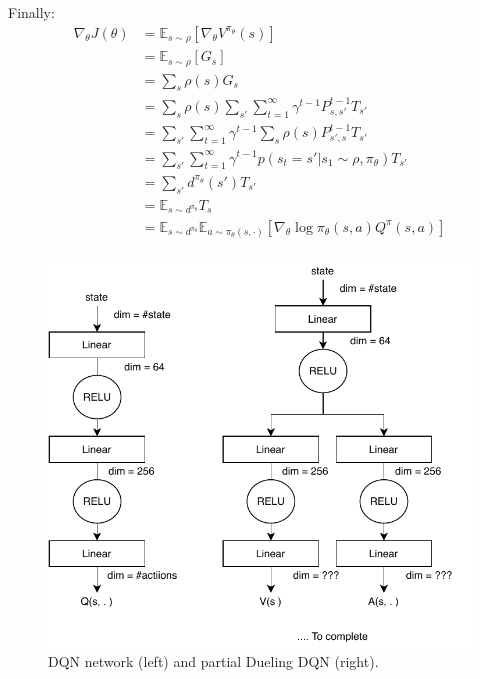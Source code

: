 \documentclass[a4paper]{article}
\begin{document}
Finally:
\begin{equation*}
    \begin{aligned}
        \nabla_\theta J(\theta) & = \mathbb{E}_{s \sim \rho}\left[ \nabla_\theta V^{\pi_\theta}(s) \right]                  \\
                                & = \mathbb{E}_{s \sim \rho}\left[ G_s \right]                                              \\
                                & = \sum_s \rho(s) G_s                                                                      \\
                                & = \sum_s \rho(s) \sum_{s'} \sum_{t=1}^\infty \gamma^{t-1} P^{t-1}_{s, s'} T_{s'}          \\
                                & = \sum_{s'} \sum_{t=1}^\infty \gamma^{t-1} \sum_s \rho(s) P^{t-1}_{s', s} T_{s'}          \\
                                & = \sum_{s'} \sum_{t=1}^\infty \gamma^{t-1} p(s_t = s' | s_1 \sim \rho, \pi_\theta) T_{s'} \\
                                & = \sum_{s'} d^{\pi_\theta}(s') T_{s'}                                                     \\
                                & = \mathbb{E}_{s \sim d^{\pi_\theta}} T_s                                                  \\
                                & \boxed{= \mathbb{E}_{s \sim d^{\pi_\theta}} \mathbb{E}_{a \sim \pi_\theta(s, \cdot)}
        \left[\nabla_{\theta} \log \pi_\theta(s,a) Q^\pi(s,a)\right]}                                                       \\
    \end{aligned}
\end{equation*}


\begin{figure}
    \centering
    \includegraphics[width=.4\textwidth]{images/networks}
    \caption{DQN network (left) and partial Dueling DQN (right).}
    \label{fig:net}
    \vspace{-50pt}
\end{figure}
\end{document}
